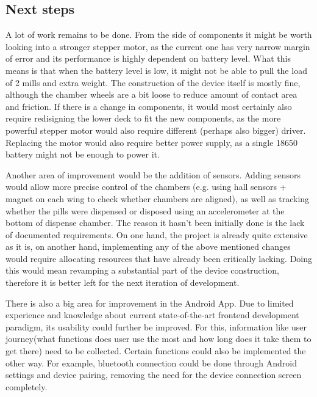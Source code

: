 \subsection{Next steps}
A lot of work remains to be done. From the side of components it might be worth looking into a stronger stepper motor, as the current one has very narrow margin of error and its performance is highly dependent on battery level. What this means is that when the battery level is low, it might not be able to pull the load of 2 mills and extra weight. The construction of the device itself is mostly fine, although the chamber wheels are a bit loose to reduce amount of contact area and friction. If there is a change in components, it would most certainly also require redisigning the lower deck to fit the new components, as the more powerful stepper motor would also require different (perhaps also bigger) driver.  Replacing the motor would also require better power supply, as a single 18650 battery might not be enough to power it. 

Another area of improvement would be the addition of sensors. Adding sensors would allow more precise control of the chambers (e.g. using hall sensors + magnet on each wing to check whether chambers are aligned), as well as tracking whether the pills were dispensed or disposed using an accelerometer at the bottom of dispense chamber.
The reason it hasn't been initially done is the lack of documented requirements. On one hand, the project is already quite extensive as it is, on another hand, implementing any of the above mentioned changes would require allocating resources that have already been critically lacking. Doing this would mean revamping a substantial part of the device construction, therefore it is better left for the next iteration of development.

There is also a big area for improvement in the Android App. Due to limited experience and knowledge about current state-of-the-art frontend development paradigm, its usability could further be improved. For this, information like user journey(what functions does user use the most and how long does it take them to get there) need to be collected. Certain functions could also be implemented the other way. For example, bluetooth connection could be done through Android settings and device pairing, removing the need for the device connection screen completely.




%